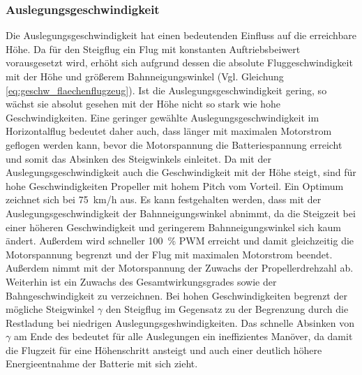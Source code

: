 \subsubsection{Auslegungsgeschwindigkeit}
Die Auslegungsgeschwindigkeit hat einen bedeutenden Einfluss auf die erreichbare Höhe. Da für den Steigflug ein Flug mit konstanten Auftriebsbeiwert vorausgesetzt wird, erhöht sich aufgrund dessen die absolute Fluggeschwindigkeit mit der Höhe und größerem Bahnneigungswinkel (Vgl. Gleichung \ref{eq:geschw_flaechenflugzeug}).
Ist die Auslegungsgeschwindigkeit gering, so wächst sie absolut gesehen mit der Höhe nicht so stark wie hohe Geschwindigkeiten. Eine geringer gewählte Auslegungsgeschwindigkeit im Horizontalflug bedeutet daher auch, dass länger mit maximalen Motorstrom geflogen werden kann, bevor die Motorspannung die Batteriespannung erreicht und somit das Absinken des Steigwinkels einleitet.
Da mit der Auslegungsgeschwindigkeit auch die Geschwindigkeit mit der Höhe steigt, sind für hohe Geschwindigkeiten Propeller mit hohem Pitch vom Vorteil.
Ein Optimum zeichnet sich bei \SI{75}{km/h} aus. Es kann festgehalten werden, dass mit der Auslegungsgeschwindigkeit der Bahnneigungswinkel abnimmt, da die Steigzeit bei einer höheren Geschwindigkeit und geringerem Bahnneigungswinkel sich kaum ändert. Außerdem wird schneller \SI{100}{\%} PWM erreicht und damit gleichzeitig die Motorspannung begrenzt und der Flug mit maximalen Motorstrom beendet. Außerdem nimmt mit der Motorspannung der Zuwachs der Propellerdrehzahl ab. Weiterhin ist ein Zuwachs des Gesamtwirkungsgrades sowie der Bahngeschwindigkeit zu verzeichnen. Bei hohen Geschwindigkeiten begrenzt der mögliche Steigwinkel \ensuremath{\gamma} den Steigflug im Gegensatz zu der Begrenzung durch die Restladung bei niedrigen Auslegungsgeshwindigkeiten. Das schnelle Absinken von \ensuremath{\gamma} am Ende des  bedeutet für alle Auslegungen ein ineffizientes Manöver, da damit die Flugzeit für eine Höhenschritt ansteigt und auch einer deutlich höhere Energieentnahme der Batterie mit sich zieht.

